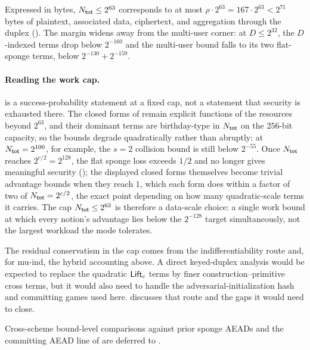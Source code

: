 Expressed in bytes, $N_{\mathsf{tot}} \leq 2^{63}$ corresponds to at most
$\rho \cdot 2^{63} = 167 \cdot 2^{63} < 2^{71}$ bytes of plaintext,
associated data, ciphertext, and aggregation through the duplex
(). The margin widens away from the multi-user corner: at
$D \leq 2^{32}$, the $D$-indexed terms drop below $2^{-160}$ and the
multi-user bound falls to its two flat-sponge terms, below
$2^{-130} + 2^{-159}$.

\paragraph{Reading the work cap.}
 is a success-probability statement at a fixed
cap, not a statement that security is exhausted there. The closed forms of
 remain explicit functions of the resources beyond
$2^{63}$, and their dominant terms are birthday-type in $N_{\mathsf{tot}}$ on the
$256$-bit capacity, so the bounds degrade quadratically rather than
abruptly: at $N_{\mathsf{tot}} = 2^{100}$, for example, the $s = 2$ collision bound is
still below $2^{-55}$. Once $N_{\mathsf{tot}}$ reaches
$2^{c/2} = 2^{128}$, the flat sponge loss exceeds $1/2$ and no longer
gives meaningful security (); the displayed
closed forms themselves become trivial advantage bounds when they
reach $1$, which each form does within a factor of two of
$N_{\mathsf{tot}} = 2^{c/2}$, the exact point depending on how many
quadratic-scale terms it carries. The cap
$N_{\mathsf{tot}} \leq 2^{63}$ is therefore a data-scale choice: a single work bound at
which every notion's advantage lies below the $2^{-128}$ target
simultaneously, not the largest workload the mode tolerates.

The residual conservatism in the cap comes from the indifferentiability route
and, for mu-ind, the hybrid accounting above. A direct keyed-duplex analysis
would be expected to replace the quadratic $\mathsf{Lift}_c$ terms by finer
construction--primitive cross terms, but it would also need to handle the
adversarial-initialization hash and committing games used here.
 discusses that route and the gaps it would need to
close.

Cross-scheme bound-level comparisons against prior sponge AEADs and
the committing AEAD line of \cite{BH22} are deferred to
.
